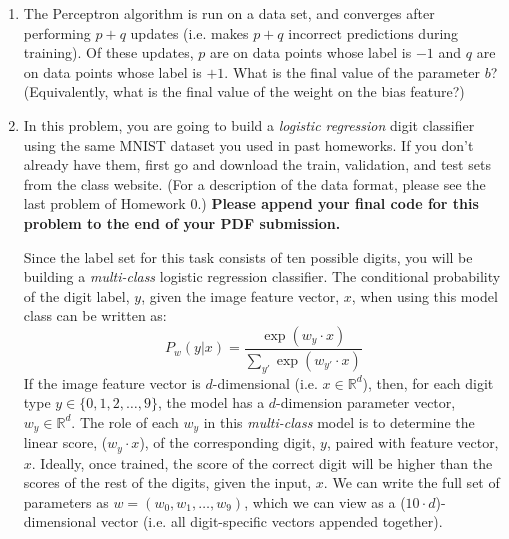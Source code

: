 \documentclass[10pt]{report}
\begin{document}
\begin{enumerate}
\item The Perceptron algorithm is run on a data set, and converges after performing $p+q$ updates (i.e. makes $p+q$ incorrect predictions during training). Of these updates, $p$ are on data points whose label is $-1$ and $q$ are on data points whose label is $+1$. What is the final value of the parameter $b$? (Equivalently, what is the final value of the weight on the bias feature?)
\begin{solution}

\end{solution}

\item In this problem, you are going to build a {\em logistic regression} digit classifier using the same MNIST dataset you used in past homeworks. If you don't already have them, first go and download the train, validation, and test sets from the class website. (For a description of the data format, please see the last problem of Homework 0.)  {\bf Please append your final code for this problem to the end of your PDF submission.}

\vspace{0.7em}

Since the label set for this task consists of ten possible digits, you will be building a {\em multi-class} logistic regression classifier. The conditional probability of the digit label, $y$, given the image feature vector, $x$, when using this model class can be written as:
\[
P_w(y|x) = \frac{\exp (w_y \cdot x)}{\sum_{y'} \exp (w_{y'} \cdot x)}       \]
If the image feature vector is $d$-dimensional (i.e. $x \in \mathbb{R}^d$), then, for each digit type $y \in \{0,1,2, \ldots, 9\}$, the model has a $d$-dimension parameter vector, $w_y \in \mathbb{R}^d$. The role of each $w_y$ in this {\em multi-class} model is to determine the linear score, ($w_y \cdot x$), of the corresponding digit, $y$, paired with feature vector, $x$. Ideally, once trained, the score of the correct digit will be higher than the scores of the rest of the digits, given the input, $x$. We can write the full set of parameters as $w = (w_0, w_1, \ldots, w_9)$, which we can view as a ($10 \cdot d$)-dimensional vector (i.e. all digit-specific vectors appended together).




\end{enumerate}
\end{document}
